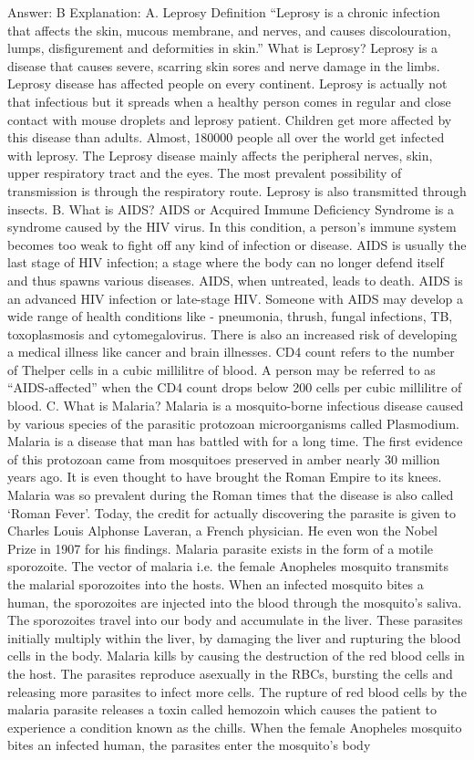 Answer: B
Explanation: A. Leprosy Definition “Leprosy is a chronic infection that affects the skin, mucous membrane, and nerves, and causes discolouration, lumps, disfigurement and deformities in skin.” What is Leprosy? Leprosy is a disease that causes severe, scarring skin sores and nerve damage in the limbs. Leprosy disease has affected people on every continent. Leprosy is actually not that infectious but it spreads when a healthy person comes in regular and close contact with mouse droplets and leprosy patient. Children get more affected by this disease than adults. Almost, 180000 people all over the world get infected with leprosy. The Leprosy disease mainly affects the peripheral nerves, skin, upper respiratory tract and the eyes. The most prevalent possibility of transmission is through the respiratory route. Leprosy is also transmitted through insects. B. What is AIDS? AIDS or Acquired Immune Deficiency Syndrome is a syndrome caused by the HIV virus. In this condition, a person’s immune system becomes too weak to fight off any kind of infection or disease. AIDS is usually the last stage of HIV infection; a stage where the body can no longer defend itself and thus spawns various diseases. AIDS, when untreated, leads to death. AIDS is an advanced HIV infection or late-stage HIV. Someone with AIDS may develop a wide range of health conditions like - pneumonia, thrush, fungal infections, TB, toxoplasmosis and cytomegalovirus. There is also an increased risk of developing a medical illness like cancer and brain illnesses. CD4 count refers to the number of Thelper cells in a cubic millilitre of blood. A person may be referred to as “AIDS-affected” when the CD4 count drops below 200 cells per cubic millilitre of blood. C. What is Malaria? Malaria is a mosquito-borne infectious disease caused by various species of the parasitic protozoan microorganisms called Plasmodium. Malaria is a disease that man has battled with for a long time. The first evidence of this protozoan came from mosquitoes preserved in amber nearly 30 million years ago. It is even thought to have brought the Roman Empire to its knees. Malaria was so prevalent during the Roman times that the disease is also called ‘Roman Fever’. Today, the credit for actually discovering the parasite is given to Charles Louis Alphonse Laveran, a French physician. He even won the Nobel Prize in 1907 for his findings. Malaria parasite exists in the form of a motile sporozoite. The vector of malaria i.e. the female Anopheles mosquito transmits the malarial sporozoites into the hosts. When an infected mosquito bites a human, the sporozoites are injected into the blood through the mosquito’s saliva. The sporozoites travel into our body and accumulate in the liver. These parasites initially multiply within the liver, by damaging the liver and rupturing the blood cells in the body. Malaria kills by causing the destruction of the red blood cells in the host. The parasites reproduce asexually in the RBCs, bursting the cells and releasing more parasites to infect more cells. The rupture of red blood cells by the malaria parasite releases a toxin called hemozoin which causes the patient to experience a condition known as the chills. When the female Anopheles mosquito bites an infected human, the parasites enter the mosquito’s body 